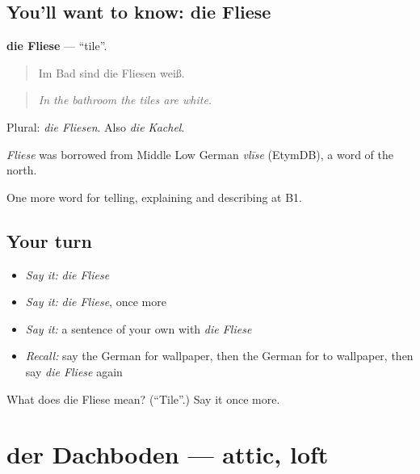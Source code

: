 \subsection*{You'll want to know: die Fliese}
\textbf{die Fliese} — \textquotedblleft{}tile\textquotedblright{}.

\begin{quote}
Im Bad sind die Fliesen weiß.
\end{quote}

\begin{quote}
\emph{In the bathroom the tiles are white.}
\end{quote}

Plural: \emph{die Fliesen}. Also \emph{die Kachel}.

\begin{cousinweb}
\emph{Fliese} was borrowed from Middle Low German \emph{vlīse} (EtymDB), a word of the north.
\end{cousinweb}

\begin{grammarlens}[title={What you've built}]
One more word for telling, explaining and describing at B1.
\end{grammarlens}

\subsection*{Your turn}
\begin{itemize}
\raggedright
  \item \emph{Say it:} \emph{die Fliese}
  \item \emph{Say it:} \emph{die Fliese}, once more
  \item \emph{Say it:} a sentence of your own with \emph{die Fliese}
  \item \emph{Recall:} say the German for wallpaper, then the German for to wallpaper, then say \emph{die Fliese} again
\end{itemize}

\begin{tcolorbox}[breakable,colback=teal!4,colframe=teal!35!black,title={Before you move on}]
What does die Fliese mean? (\textquotedblleft{}Tile\textquotedblright{}.) Say it once more.
\end{tcolorbox}
\section[der Dachboden]{der Dachboden — attic, loft}

\label{lesson:GE-C529-dachboden}



